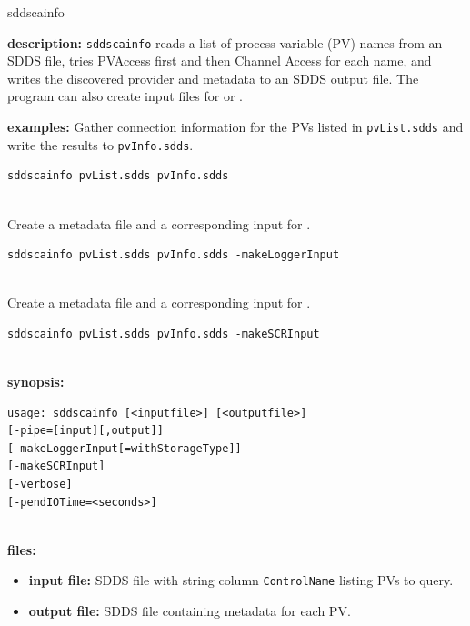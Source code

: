 %
%
\begin{sddsprog}{sddscainfo}
\item \textbf{description:}
  \verb+sddscainfo+ reads a list of process variable (PV) names from an SDDS file,
  tries PVAccess first and then Channel Access for each name, and writes the
  discovered provider and metadata to an SDDS output file.
  The program can also create input files for  or .

\item \textbf{examples:}
  Gather connection information for the PVs listed in \verb+pvList.sdds+ and write the results to \verb+pvInfo.sdds+.
  \begin{verbatim}
sddscainfo pvList.sdds pvInfo.sdds
  
\end{verbatim}
  Create a metadata file and a corresponding input for .
  \begin{verbatim}
sddscainfo pvList.sdds pvInfo.sdds -makeLoggerInput
  
\end{verbatim}
  Create a metadata file and a corresponding input for .
  \begin{verbatim}
sddscainfo pvList.sdds pvInfo.sdds -makeSCRInput
  
\end{verbatim}

\item \textbf{synopsis:}
  \begin{verbatim}
usage: sddscainfo [<inputfile>] [<outputfile>]
[-pipe=[input][,output]]
[-makeLoggerInput[=withStorageType]]
[-makeSCRInput]
[-verbose]
[-pendIOTime=<seconds>]
  
\end{verbatim}

\item \textbf{files:}
\begin{itemize}
  \item \textbf{input file:} SDDS file with string column \verb|ControlName| listing PVs to query.
  \item \textbf{output file:} SDDS file containing metadata for each PV.
\end{itemize}


\end{sddsprog}
